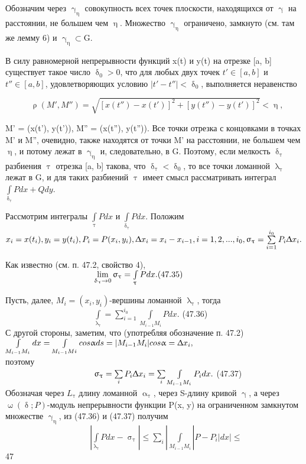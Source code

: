 \documentclass[a5paper, 11pt]{article}
\begin{document}
{\\ \\}

{

Обозначим через $\upgamma_\upeta$ совокупность всех точек плоскости, находящихся от $\upgamma$ на расстоянии, не большем чем $\upeta$. Множество $\upgamma_\upeta$ ограничено, замкнуто (см. там же лемму 6) и $\upgamma_\upeta{\subset}$G.
\par В силу равномерной непрерывности функций x(t) и y(t) на отрезке
[a, b] существует такое число $\updelta_0 > 0$, что для любых двух точек $t' \in[a,b]$ и $t''\in[a, b]$, удовлетворяющих условию $|t' - t''| < \updelta_0$, выполняется неравенство
}


{
{\verb{      {$\uprho(M', M'')=\sqrt{[x(t'')-x(t')]^2+[y(t'')-y(t')]^2}<\upeta, $}

 M' = (x(t'), y(t')), M'' = (x(t''), y(t'')). Все точки отрезка с концовками в точках M' и M'', очевидно, также находятся от точки M' на расстоянии, не большем чем $\upeta$, и потому лежат в $\upgamma_\upeta$ и, следовательно, в G. Поэтому, если мелкость $\updelta_\uptau$ разбиения $\uptau$ отрезка [a, b] такова, что $\updelta_\uptau < \updelta_0$, то все точки ломанной $\uplambda_\uptau$ лежат в G, и для таких разбиений $\uptau$ имеет смысл рассматривать интеграл $\int\limits_{\updelta_\uptau}{Pdx}+ Qdy$.
\par Рассмотрим интегралы $\int\limits_\uptau{P} dx$ и $ \int\limits_{\updelta_\uptau}P dx.$ Положим \\
$x_i=x(t_i), y_i=y(t_i), P_i=P(x_i, y_i), \Updelta{x_i=x_i-x_{i-1}}, i=1, 2,  ..., i_0, \upsigma_\uptau=\sum\limits_{i=1}^{i_0}P_i\Updelta{x_i}.$
\par Как известно (см. п. 47.2, свойство 4),\\
{\verb{                     {$\lim\limits_{\updelta_\uptau\to0} \upsigma_\uptau =\int\limits_\uptau{P} dx. \hfill{(47.35)}$}
\par Пусть, далее, $M_i=(x_i, y_i)$-вершины ломанной $\uplambda_\uptau$, тогда \\
{\verb{                     { $\int\limits_{\uplambda_\uptau}=\sum\limits_{i=1}^{i_0}\int\limits_{M_{i-1}  M_i}P dx.$} \hfill{(47.36)}\\
С другой стороны, заметим, что (употребляя обозначение п. 47.2)\\
$\int\limits_{M_{i-1} M_i}dx=\int\limits_{M_{i-1} Mi}cos \upalpha ds=|M_{i-1}M_i|cos \upalpha=\Updelta{x_i},$ \\
поэтому\\
{\verb{                     {$\upsigma_\uptau=\sum\limits_i P_i \Updelta{x_i}=\sum\limits_i\int\limits_{M_{i-1} M_i}P_i dx.$} \hfill{(47.37)}\\
Обозначая через $L_\uptau$ длину ломанной $\upalpha_\uptau$, через S-длину кривой $\upgamma$, а через $\upomega(\updelta; P)$-модуль непрерывности функции P(x, y) на ограниченном замкнутом множестве $\upgamma_\upeta$, из (47.36) и (47.37) получим \\
{\verb{                    {$|\int\limits_{\uplambda_\uptau} P dx-\upsigma_\uptau| \leqslant \sum\limits_i|\int\limits_{M_{i-1} M_i} |P-P_i|dx | \leqslant$} \\
47
}
\end{document}
